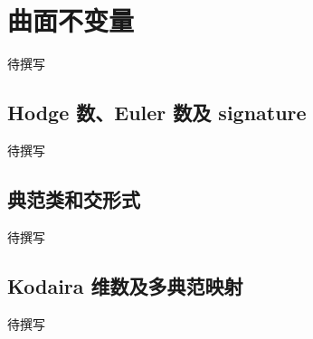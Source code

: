 
% 
% 

\section{曲面不变量}
\label{g4:sec:3001}

待撰写

\subsection{Hodge 数、Euler 数及 signature}
\label{g4:subsec:3001:01}
待撰写

\subsection{典范类和交形式}
\label{g4:subsec:3001:02}
待撰写

\subsection{Kodaira 维数及多典范映射}
\label{g4:subsec:3001:03}
待撰写
